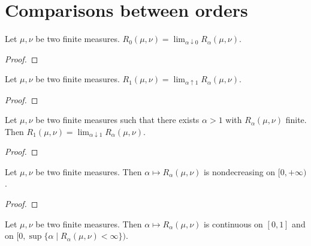 \section{Comparisons between orders}

\begin{lemma}
  \label{lem:renyi_tendsto_renyi_zero}
  Let $\mu, \nu$ be two finite measures. $R_0(\mu, \nu) = \lim_{\alpha \downarrow 0} R_\alpha(\mu, \nu)$.
\end{lemma}

\begin{proof}
\end{proof}

\begin{lemma}
  \label{lem:renyi_tendsto_renyi_one}
  Let $\mu, \nu$ be two finite measures. $R_1(\mu, \nu) = \lim_{\alpha \uparrow 1} R_\alpha(\mu, \nu)$.
\end{lemma}

\begin{proof}
\end{proof}

\begin{lemma}
  \label{lem:renyi_tendsto_renyi_one_above}
  Let $\mu, \nu$ be two finite measures such that there exists $\alpha > 1$ with $R_\alpha(\mu, \nu)$ finite. Then $R_1(\mu, \nu) = \lim_{\alpha \downarrow 1} R_\alpha(\mu, \nu)$.
\end{lemma}

\begin{proof}
\end{proof}

\begin{lemma}
  \label{lem:renyi_monotone}
  Let $\mu, \nu$ be two finite measures. Then $\alpha \mapsto R_\alpha(\mu, \nu)$ is nondecreasing on $[0, + \infty)$.
\end{lemma}

\begin{proof}
\end{proof}

\begin{lemma}
  \label{lem:renyi_continuous}
  Let $\mu, \nu$ be two finite measures. Then $\alpha \mapsto R_\alpha(\mu, \nu)$ is continuous on $[0, 1]$ and on $[0, \sup \{\alpha \mid R_\alpha(\mu, \nu) < \infty\})$.
\end{lemma}


